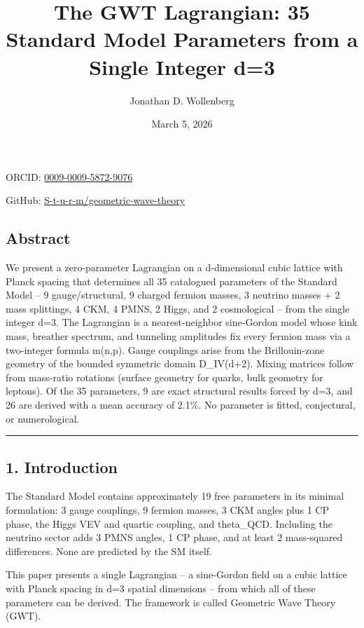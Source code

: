 \documentclass[
]{article}
\title{The GWT Lagrangian: 35 Standard Model Parameters from a Single
Integer d=3}
\author{Jonathan D. Wollenberg}
\date{March 5, 2026}
\begin{document}
\maketitle

ORCID: \href{https://orcid.org/0009-0009-5872-9076}{0009-0009-5872-9076}

GitHub:
\href{https://github.com/S-t-u-r-m/geometric-wave-theory}{S-t-u-r-m/geometric-wave-theory}

\subsection{Abstract}\label{abstract}

We present a zero-parameter Lagrangian on a d-dimensional cubic lattice
with Planck spacing that determines all 35 catalogued parameters of the
Standard Model -- 9 gauge/structural, 9 charged fermion masses, 3
neutrino masses + 2 mass splittings, 4 CKM, 4 PMNS, 2 Higgs, and 2
cosmological -- from the single integer d=3. The Lagrangian is a
nearest-neighbor sine-Gordon model whose kink mass, breather spectrum,
and tunneling amplitudes fix every fermion mass via a two-integer
formula m(n,p). Gauge couplings arise from the Brillouin-zone geometry
of the bounded symmetric domain D\_IV(d+2). Mixing matrices follow from
mass-ratio rotations (surface geometry for quarks, bulk geometry for
leptons). Of the 35 parameters, 9 are exact structural results forced by
d=3, and 26 are derived with a mean accuracy of 2.1\%. No parameter is
fitted, conjectural, or numerological.

\begin{center}\rule{0.5\linewidth}{0.5pt}\end{center}

\subsection{1. Introduction}\label{introduction}

The Standard Model contains approximately 19 free parameters in its
minimal formulation: 3 gauge couplings, 9 fermion masses, 3 CKM angles
plus 1 CP phase, the Higgs VEV and quartic coupling, and theta\_QCD.
Including the neutrino sector adds 3 PMNS angles, 1 CP phase, and at
least 2 mass-squared differences. None are predicted by the SM itself.

This paper presents a single Lagrangian -- a sine-Gordon field on a
cubic lattice with Planck spacing in d=3 spatial dimensions -- from
which all of these parameters can be derived. The framework is called
Geometric Wave Theory (GWT).
\end{document}
